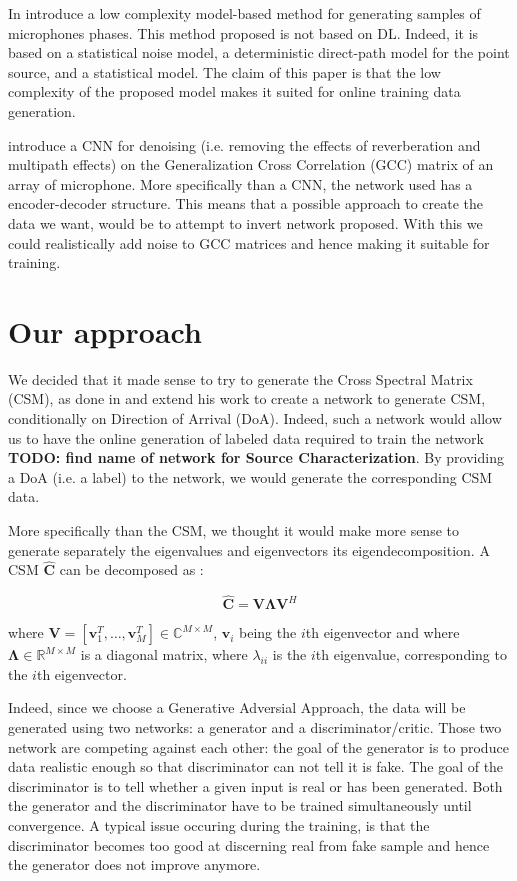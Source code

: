 \documentclass{article}
\begin{document}
In \cite{hubner2021efficient} introduce a low complexity model-based method for generating samples of microphones phases. This method proposed is not based on DL. Indeed, it is based on a statistical noise model, a deterministic direct-path model for the point source, and a statistical model. The claim of this paper is that the low complexity of the proposed  model makes it suited for online training data generation. 

\cite{vera2021acoustic} introduce a CNN for denoising (i.e. removing the effects of reverberation and multipath effects) on the Generalization Cross Correlation (GCC) matrix of an array of microphone. More specifically than a CNN, the network used has a encoder-decoder structure. This means that a possible approach to create the data we want, would be to attempt to invert network proposed. With this we could realistically add noise to GCC matrices and hence making it suitable for training.

\section{Our approach}

We decided that it made sense to try to generate the Cross Spectral Matrix (CSM), as done in \cite{gerstoft2020parametric} and extend his work to create a network to generate CSM, conditionally on Direction of Arrival (DoA). Indeed, such a network would allow us to have the online generation of labeled data required to train the network \textbf{TODO: find name of network for Source Characterization}. By providing a DoA (i.e. a label) to the network, we would generate the corresponding CSM data.

More specifically than the CSM, we thought it would make more sense to generate separately the eigenvalues and eigenvectors its eigendecomposition. A CSM $\mathbf{\hat{C}}$ can be decomposed as :

\begin{equation}
    \mathbf{\hat{C}} = \mathbf{V} \mathbf{\Lambda} \mathbf{V}^H
\end{equation}

where $\mathbf{V} = [\mathbf{v}_1^T, \dots, \mathbf{v}_M^T] \in \mathbb{C}^{M \times M}$, $\mathbf{v}_i$ being the $i$th eigenvector and where $\mathbf{\Lambda} \in \mathbb{R}^{M \times M}$ is a diagonal matrix, where $\lambda_{ii}$ is the $i$th eigenvalue, corresponding to the $i$th eigenvector.

Indeed, since we choose a Generative Adversial Approach, the data will be generated using two networks: a generator and a discriminator/critic. Those two network are competing against each other: the goal of the generator is to produce data realistic enough so that discriminator can not tell it is fake. The goal of the discriminator is to tell whether a given input is real or has been generated. Both the generator and the discriminator have to be trained simultaneously until convergence. A typical issue occuring during the training, is that the discriminator becomes too good at discerning real from fake sample and hence the generator does not improve anymore.
\end{document}
